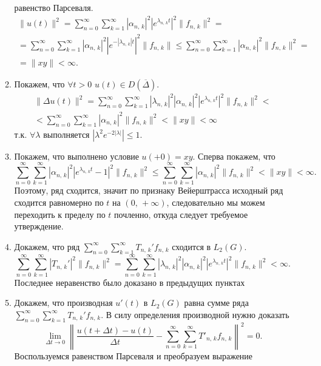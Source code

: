 \documentclass[a4paper]{article}
\begin{document}
\begin{sol}
\begin{enumerate}
\begin{enumerate}
	равенство Парсеваля.
\begin{multline*}
	\| u(t)\|^2=\sum_{n=0}^{\infty} \sum_{k=1}^{\infty} 
	|\alpha_{n,\,k}|^2 |e^{\lambda_{n,\,k}t}|^2 \| f_{n,\,k}\|^2 =\\= \sum_{n=0}^{\infty} \sum_{k=1}^{\infty} 
	|\alpha_{n,\,k}|^2 |e^{-|\lambda_{n,\,k}|t}|^2
	\| f_{n,\,k}\|\le 
	\sum_{n=0}^{\infty} \sum_{k=1}^{\infty} 
	|\alpha_{n,\,k}|^2\| f_{n,\,k}\|^2 =
	\\= \| xy\|<\infty
.\end{multline*} 
\item Покажем, что $\forall t>0$ $u(t) \in D\left(\overline{\Delta}\right)$.
	\begin{multline*}
\| \Delta u(t)\|^2=\sum_{n=0}^{\infty} \sum_{k=1}^{\infty} 
	|\lambda_{n,\,k}|^2|\alpha_{n,\,k}|^2 |e^{\lambda_{n,\,k}t}|^2 \| f_{n,\,k}\|^2<\\<\sum_{n=0}^{\infty} \sum_{k=1}^{\infty} |\alpha_{n,\,k}|^2 \| f_{n,\,k}\|^2<\| xy\|<\infty
	\end{multline*}
	т.\:к. $\forall \lambda$ выполняется $|\lambda^2 e^{-2|\lambda|}|\le 1$.
\item  Покажем, что выполнено условие $u(+0)=xy$. Сперва покажем,
	что
\[
\sum_{n=0}^{\infty} \sum_{k=1}^{\infty} 
|\alpha_{n,\,k}|^2|e^{\lambda_{n,\,k}t}-1|^2\|f_{n,\,k}\|^2\le 
\sum_{n=0}^{\infty} \sum_{k=1}^{\infty} |\alpha_{n,\,k}|^2
\| f_{n,\,k}\|^2<\| xy\|<\infty
.\] 
Поэтому, ряд сходится, значит по признаку Вейерштрасса исходный ряд
сходится равномерно по $t$ на $(0,\,+\infty)$, следовательно
мы можем переходить к пределу по $t$ почленно, откуда следует
требуемое утверждение.
\item Докажем, что ряд $\displaystyle \sum_{n=0}^{\infty} \sum_{k=1}^{\infty} T_{n,\,k}'f_{n,\,k}$ сходится в $L_2(G)$.
\[
\sum_{n=0}^{\infty} \sum_{k=1}^{\infty} |T_{n,\,k}'|^2 \| f_{n,\,k}\|^2 = \sum_{n=0}^{\infty} \sum_{k=1}^{\infty} 
	|\lambda_{n,\,k}|^2|\alpha_{n,\,k}|^2 |e^{\lambda_{n,\,k}t}|^2 \| f_{n,\,k}\|^2<\infty
.\] 
Последнее неравенство было доказано в предыдущих пунктах
\item Докажем, что производная $u'(t)$ в $L_2(G)$ равна
	сумме ряда $\displaystyle \sum_{n=0}^{\infty} 
	\sum_{k=1}^{\infty} T_{n,\,k}'f_{n,\,k}$. В силу
	определения производной нужно доказать
	\[
		\lim_{\Delta t \to 0} \left\lVert \frac{u(t+\Delta t)-u(t)}{\Delta t}- \sum_{n=0}^{\infty} \sum_{k=1}^{\infty} 
		T'_{n,\,k}f_{n,\,k}\right\rVert^2=0
	.\] 
	Воспользуемся равенством Парсеваля и преобразуем выражение
	\begin{multline*}

\end{multline*}
\end{enumerate}
\end{enumerate}
\end{sol}
\end{document}
